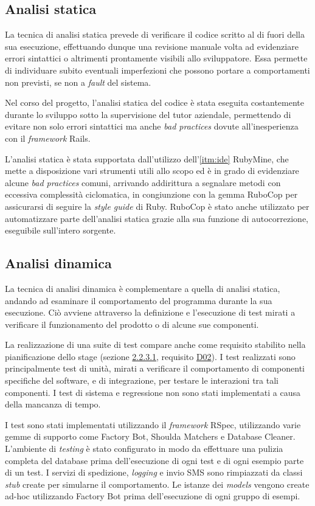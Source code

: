 \subsection{Analisi statica}
La tecnica di analisi statica prevede di verificare il codice scritto al di fuori della sua esecuzione, effettuando dunque una revisione manuale volta ad evidenziare errori sintattici o altrimenti prontamente visibili allo sviluppatore. Essa permette di individuare subito eventuali imperfezioni che possono portare a comportamenti non previsti, se non a \textit{fault} del sistema.

Nel corso del progetto, l'analisi statica del codice è stata eseguita costantemente durante lo sviluppo sotto la supervisione del tutor aziendale, permettendo di evitare non solo errori sintattici ma anche \textit{bad practices} dovute all'inesperienza con il \textit{framework} Rails.

L'analisi statica è stata supportata dall'utilizzo dell'\ref{itm:ide} RubyMine, che mette a disposizione vari strumenti utili allo scopo ed è in grado di evidenziare alcune \textit{bad practices} comuni, arrivando addirittura a segnalare metodi con eccessiva complessità ciclomatica, in congiunzione con la gemma RuboCop per assicurarsi di seguire la \textit{style guide} di Ruby. RuboCop è stato anche utilizzato per automatizzare parte dell'analisi statica grazie alla sua funzione di autocorrezione, eseguibile sull'intero sorgente.
\subsection{Analisi dinamica}
La tecnica di analisi dinamica è complementare a quella di analisi statica, andando ad esaminare il comportamento del programma durante la sua esecuzione. Ciò avviene attraverso la definizione e l'esecuzione di test mirati a verificare il funzionamento del prodotto o di alcune sue componenti.

La realizzazione di una suite di test compare anche come requisito stabilito nella pianificazione dello stage (sezione \hyperref[sec:reqs]{2.2.3.1}, requisito \underline{D02}). I test realizzati sono principalmente test di unità, mirati a verificare il comportamento di componenti specifiche del software, e di integrazione, per testare le interazioni tra tali componenti. I test di sistema e regressione non sono stati implementati a causa della mancanza di tempo.

I test sono stati implementati utilizzando il \textit{framework} RSpec, utilizzando varie gemme di supporto come Factory Bot, Shoulda Matchers e Database Cleaner. L'ambiente di \textit{testing} è stato configurato in modo da effettuare una pulizia completa del database prima dell'esecuzione di ogni test e di ogni esempio parte di un test. I servizi di spedizione, \textit{logging} e invio SMS sono rimpiazzati da classi \textit{stub} create per simularne il comportamento. Le istanze dei \textit{models} vengono create ad-hoc utilizzando Factory Bot prima dell'esecuzione di ogni gruppo di esempi.

